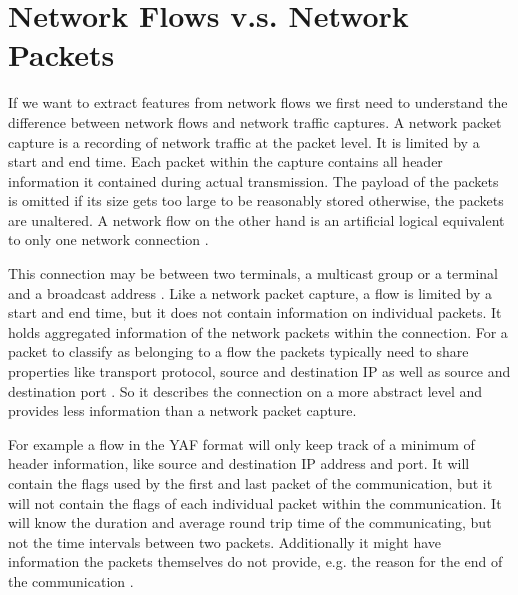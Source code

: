 \documentclass[
	ngerman,
	ruledheaders=section,%
	class=report,%
	thesis={type=bachelor},%
	accentcolor=9c,%
	custommargins=true,%
	marginpar=false,%
	parskip=half-,%
	fontsize=11pt,%
]{tudapub}
\begin{document}
\section{Network Flows v.s. Network Packets}

If we want to extract features from network flows
we first need to understand the difference between network flows and network traffic captures.
A network packet capture is a recording of network traffic at the packet level.
It is limited by a start and end time.
Each packet within the capture contains all header information it contained during actual transmission.
The payload of the packets is omitted if its size gets too large to be reasonably stored otherwise, the packets are unaltered.
A network flow on the other hand is an artificial logical equivalent to only one network connection \cite{brownleeTrafficFlowMeasurement}.

This connection may be between two terminals, a multicast group or a terminal and a broadcast address \cite{rajahalmeIPv6FlowLabel}.
Like a network packet capture, a flow is limited by a start and end time,
but it does not contain information on individual packets.
It holds aggregated information of the network packets within the connection.
For a packet to classify as belonging to a flow the packets typically need to share properties like transport protocol, source and destination IP as well as source and destination port \cite{FlowbasedNetworkTraffic} \cite{claiseSpecificationIPFlow}.
So it describes the connection on a more abstract level and provides less information than a network packet capture.

For example a flow in the YAF format will only keep track of a minimum of header information, like source and destination IP address and port.
It will contain the flags used by the first and last packet of the communication,
but it will not contain the flags of each individual packet within the communication.
It will know the duration and average round trip time of the communicating, but not the time intervals between two packets.
Additionally it might have information the packets themselves do not provide, e.g. the reason for the end of the communication \cite{YAFDocumentation}.

\end{document}
